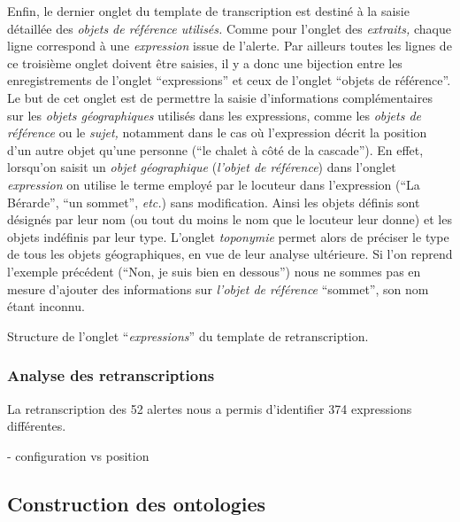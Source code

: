 Enfin, le dernier onglet du template de transcription est destiné à la
saisie détaillée des \emph{objets de référence utilisés.} Comme pour
l'onglet des \emph{extraits,} chaque ligne correspond à une
\emph{expression} issue de l'alerte. Par ailleurs toutes les lignes de
ce troisième onglet doivent être saisies, il y a donc une bijection
entre les enregistrements de l'onglet \enquote{expressions} et ceux de
l'onglet \enquote{objets de référence}. Le but de cet onglet est de
permettre la saisie d'informations complémentaires sur les
\emph{objets géographiques} utilisés dans les expressions, comme les
\emph{objets de référence} ou le \emph{sujet,} notamment dans le cas
où l'expression décrit la position d'un autre objet qu'une personne
(\eg \enquote{le chalet à côté de la cascade}). En effet, lorsqu'on
saisit un \emph{objet géographique} (\eg \emph{l'objet de référence})
dans l'onglet \emph{expression} on utilise le terme employé par le
locuteur dans l'expression (\eg \enquote{La Bérarde}, \enquote{un
  sommet}, \emph{etc.}) sans modification. Ainsi les objets définis
sont désignés par leur nom (ou tout du moins le nom que le locuteur
leur donne) et les objets indéfinis par leur type. L'onglet
\emph{toponymie} permet alors de préciser le type de tous les objets
géographiques, en vue de leur analyse ultérieure. Si l'on reprend
l'exemple précédent (\ie \enquote{Non, je suis bien en dessous}) nous
ne sommes pas en mesure d'ajouter des informations sur \emph{l'objet
  de référence} \enquote{sommet}, son nom étant inconnu.

\begin{table}
  \centering
  
  \caption{Structure de l'onglet \enquote{\emph{expressions}} du
    template de retranscription.}
  \label{tab:struct_temp}
\end{table}

\subsubsection{Analyse des retranscriptions}

La retranscription des 52 alertes nous a permis d'identifier 374
expressions différentes.

- configuration vs position

\subsection{Construction des ontologies}

